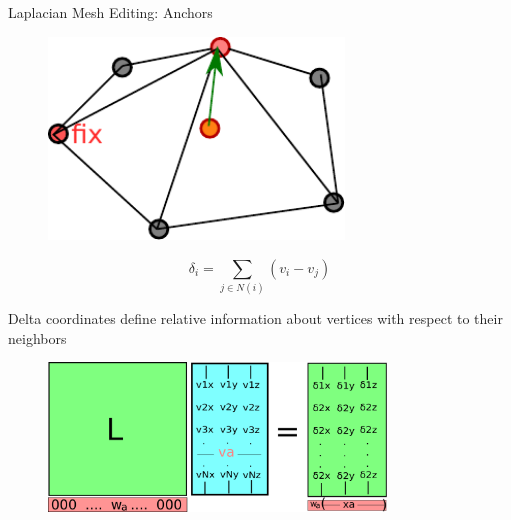\documentclass{beamer}
\begin{document}
\begin{frame}{Laplacian Mesh Editing: Anchors}

\begin{minipage}{0.45\textwidth}{
\begin{figure}[t]
    \includegraphics[width=0.7\textwidth]{2DDiscreteCurvatureAnchor1.pdf}
\end{figure}
}
\end{minipage}
\begin{minipage}{0.45\textwidth}
\[ \delta_i = \sum_{j \in N(i)} (v_i - v_j)\]

Delta coordinates define relative information about vertices with respect to their neighbors
\end{minipage}

\begin{figure}[t]
    \includegraphics[width=0.8\textwidth]{LaplacianReconstruction1Anchor.pdf}
\end{figure}

\end{frame}
\end{document}
